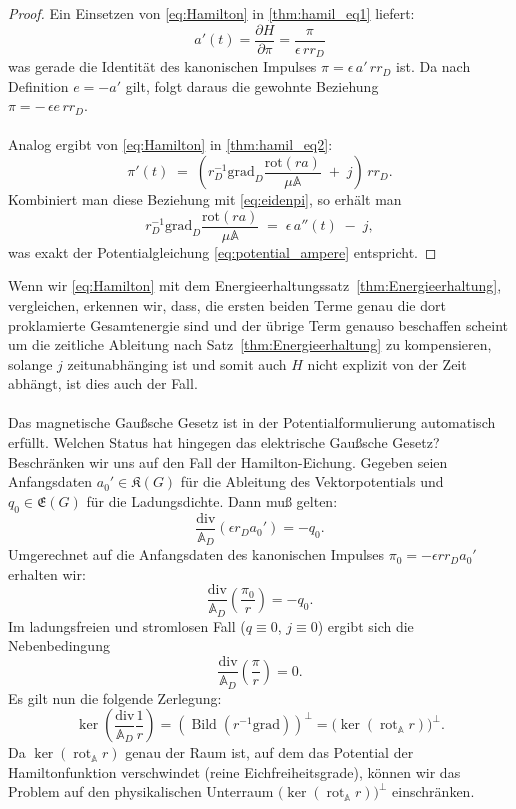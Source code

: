 \documentclass[11pt,a4paper,leqno]{report}
\numberwithin{equation}{chapter}
\begin{document}
\begin{proof}
	Ein Einsetzen von \eqref{eq:Hamilton} in \eqref{thm:hamil_eq1} liefert:\\
	\begin{equation}\label{eq:eidenpi}
		a'(t) = \frac{\partial H}{\partial \pi}=\frac{\pi}{\epsilon\,rr_D}
	\end{equation}
	was gerade die Identität des kanonischen Impulses \(\pi = \epsilon\,a'\,rr_D\) ist.  
	Da nach Definition \(e = -a'\) gilt, folgt daraus die gewohnte Beziehung\\
	\(\pi = -\,\epsilon e\,rr_D\).\\
	\\
	Analog ergibt von \eqref{eq:Hamilton} in \eqref{thm:hamil_eq2}:\\
	\begin{equation}
		\pi'(t) \;=\; \left(r_D^{-1}\mathrm{grad}_D\frac{\mathrm{rot}(r a)}{\mu\mathbb{A}} \;+\; j\right)\,rr_D.
	\end{equation}
	Kombiniert man diese Beziehung mit \eqref{eq:eidenpi}, so erhält man
	\begin{equation}
		r_D^{-1}\mathrm{grad}_D\frac{\mathrm{rot}(r a)}{\mu\mathbb{A}} 
		\;=\; \epsilon\,a''(t) \;-\; j,
	\end{equation}
	was exakt der Potentialgleichung \eqref{eq:potential_ampere} entspricht.
\end{proof}
\noindent
Wenn wir \eqref{eq:Hamilton} mit dem Energieerhaltungssatz~\ref{thm:Energieerhaltung}, vergleichen, erkennen wir, dass, die ersten beiden Terme genau die dort proklamierte Gesamtenergie sind und der \"ubrige Term genauso beschaffen scheint um die zeitliche Ableitung nach Satz~\ref{thm:Energieerhaltung} zu kompensieren, solange $j$ zeitunabh\"anging ist und somit auch $H$ nicht explizit von der Zeit abh\"angt, ist dies auch der Fall.
\\
\\
Das magnetische Gaußsche Gesetz ist in der Potentialformulierung automatisch erfüllt. 
Welchen Status hat hingegen das elektrische Gaußsche Gesetz? Beschränken wir uns auf 
den Fall der Hamilton-Eichung. Gegeben seien Anfangsdaten \(a_0'\in\mathfrak{K}(G)\) 
für die Ableitung des Vektorpotentials und \(q_0\in\mathfrak{E}(G)\) für die 
Ladungsdichte. Dann muß gelten:
\[
\frac{\mathrm{div}}{\mathbb{A}_D}(\epsilon r_D a_0') = -q_0.
\]
Umgerechnet auf die Anfangsdaten des kanonischen Impulses \(\pi_0 = -\epsilon r r_D a_0'\) 
erhalten wir:
\[
\frac{\mathrm{div}}{\mathbb{A}_D}\!\left(\frac{\pi_0}{r}\right) = -q_0.
\]
Im ladungsfreien und stromlosen Fall (\(q\equiv 0\), \(j\equiv 0\)) ergibt sich die 
Nebenbedingung
\[
\frac{\mathrm{div}}{\mathbb{A}_D}\!\left(\frac{\pi}{r}\right) = 0.
\]
Es gilt nun die folgende Zerlegung:
\[
\ker\!\left(\frac{\mathrm{div}}{\mathbb{A}_D}\frac{1}{r}\right) 
= (\operatorname{Bild}( r^{-1}\mathrm{grad}))^\perp
= \bigl(\ker(\operatorname{rot}_{\mathbb{A}} r)\bigr)^\perp.
\]
Da \(\ker(\operatorname{rot}_{\mathbb{A}} r)\) genau der Raum ist, auf dem das Potential 
der Hamiltonfunktion verschwindet (reine Eichfreiheitsgrade), können wir das Problem 
auf den physikalischen Unterraum \(\bigl(\ker(\operatorname{rot}_{\mathbb{A}} r)\bigr)^\perp\) 
einschränken.
\newpage
\end{document}
